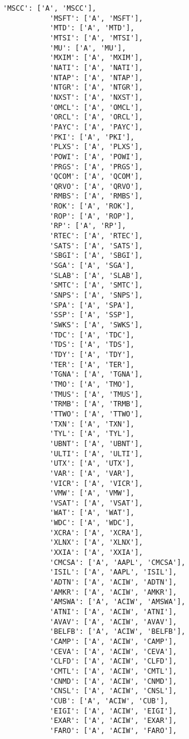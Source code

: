 \documentclass[11pt]{article}
\begin{document}
\begin{Verbatim}[commandchars=\\\{\}]
           'MSCC': ['A', 'MSCC'],
           'MSFT': ['A', 'MSFT'],
           'MTD': ['A', 'MTD'],
           'MTSI': ['A', 'MTSI'],
           'MU': ['A', 'MU'],
           'MXIM': ['A', 'MXIM'],
           'NATI': ['A', 'NATI'],
           'NTAP': ['A', 'NTAP'],
           'NTGR': ['A', 'NTGR'],
           'NXST': ['A', 'NXST'],
           'OMCL': ['A', 'OMCL'],
           'ORCL': ['A', 'ORCL'],
           'PAYC': ['A', 'PAYC'],
           'PKI': ['A', 'PKI'],
           'PLXS': ['A', 'PLXS'],
           'POWI': ['A', 'POWI'],
           'PRGS': ['A', 'PRGS'],
           'QCOM': ['A', 'QCOM'],
           'QRVO': ['A', 'QRVO'],
           'RMBS': ['A', 'RMBS'],
           'ROK': ['A', 'ROK'],
           'ROP': ['A', 'ROP'],
           'RP': ['A', 'RP'],
           'RTEC': ['A', 'RTEC'],
           'SATS': ['A', 'SATS'],
           'SBGI': ['A', 'SBGI'],
           'SGA': ['A', 'SGA'],
           'SLAB': ['A', 'SLAB'],
           'SMTC': ['A', 'SMTC'],
           'SNPS': ['A', 'SNPS'],
           'SPA': ['A', 'SPA'],
           'SSP': ['A', 'SSP'],
           'SWKS': ['A', 'SWKS'],
           'TDC': ['A', 'TDC'],
           'TDS': ['A', 'TDS'],
           'TDY': ['A', 'TDY'],
           'TER': ['A', 'TER'],
           'TGNA': ['A', 'TGNA'],
           'TMO': ['A', 'TMO'],
           'TMUS': ['A', 'TMUS'],
           'TRMB': ['A', 'TRMB'],
           'TTWO': ['A', 'TTWO'],
           'TXN': ['A', 'TXN'],
           'TYL': ['A', 'TYL'],
           'UBNT': ['A', 'UBNT'],
           'ULTI': ['A', 'ULTI'],
           'UTX': ['A', 'UTX'],
           'VAR': ['A', 'VAR'],
           'VICR': ['A', 'VICR'],
           'VMW': ['A', 'VMW'],
           'VSAT': ['A', 'VSAT'],
           'WAT': ['A', 'WAT'],
           'WDC': ['A', 'WDC'],
           'XCRA': ['A', 'XCRA'],
           'XLNX': ['A', 'XLNX'],
           'XXIA': ['A', 'XXIA'],
           'CMCSA': ['A', 'AAPL', 'CMCSA'],
           'ISIL': ['A', 'AAPL', 'ISIL'],
           'ADTN': ['A', 'ACIW', 'ADTN'],
           'AMKR': ['A', 'ACIW', 'AMKR'],
           'AMSWA': ['A', 'ACIW', 'AMSWA'],
           'ATNI': ['A', 'ACIW', 'ATNI'],
           'AVAV': ['A', 'ACIW', 'AVAV'],
           'BELFB': ['A', 'ACIW', 'BELFB'],
           'CAMP': ['A', 'ACIW', 'CAMP'],
           'CEVA': ['A', 'ACIW', 'CEVA'],
           'CLFD': ['A', 'ACIW', 'CLFD'],
           'CMTL': ['A', 'ACIW', 'CMTL'],
           'CNMD': ['A', 'ACIW', 'CNMD'],
           'CNSL': ['A', 'ACIW', 'CNSL'],
           'CUB': ['A', 'ACIW', 'CUB'],
           'EIGI': ['A', 'ACIW', 'EIGI'],
           'EXAR': ['A', 'ACIW', 'EXAR'],
           'FARO': ['A', 'ACIW', 'FARO'],

\end{Verbatim}
\end{document}
